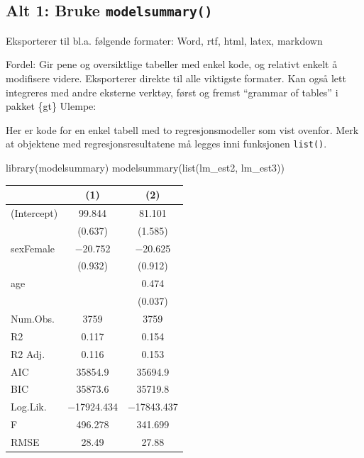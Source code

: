 \documentclass[
  letterpaper,
  DIV=11,
  numbers=noendperiod]{scrreprt}
\newenvironment{Shaded}{\begin{snugshade}}{\end{snugshade}}
\newcommand{\FunctionTok}[1]{\textcolor[rgb]{0.28,0.35,0.67}{#1}}
\newcommand{\NormalTok}[1]{\textcolor[rgb]{0.00,0.23,0.31}{#1}}
\theoremstyle{definition}
\theoremstyle{remark}
\begin{document}
\hypertarget{alt-1-bruke-modelsummary}{%
\subsection{\texorpdfstring{Alt 1: Bruke
\texttt{modelsummary()}}{Alt 1: Bruke modelsummary()}}\label{alt-1-bruke-modelsummary}}

Eksporterer til bl.a. følgende formater: Word, rtf, html, latex,
markdown

Fordel: Gir pene og oversiktlige tabeller med enkel kode, og relativt
enkelt å modifisere videre. Eksporterer direkte til alle viktigste
formater. Kan også lett integreres med andre eksterne verktøy, først og
fremst ``grammar of tables'' i pakket \{gt\} Ulempe:

Her er kode for en enkel tabell med to regresjonsmodeller som vist
ovenfor. Merk at objektene med regresjonsresultatene må legges inni
funksjonen \texttt{list()}.

\begin{Shaded}
\begin{Highlighting}[]
\FunctionTok{library}\NormalTok{(modelsummary)}
\FunctionTok{modelsummary}\NormalTok{(}\FunctionTok{list}\NormalTok{(lm\_est2, lm\_est3))}
\end{Highlighting}
\end{Shaded}

\begin{table}
\centering
\begin{tabular}[t]{lcc}
\toprule
  & (1) & (2)\\
\midrule
(Intercept) & \num{99.844} & \num{81.101}\\
 & (\num{0.637}) & (\num{1.585})\\
sexFemale & \num{-20.752} & \num{-20.625}\\
 & (\num{0.932}) & (\num{0.912})\\
age &  & \num{0.474}\\
 &  & (\num{0.037})\\
\midrule
Num.Obs. & \num{3759} & \num{3759}\\
R2 & \num{0.117} & \num{0.154}\\
R2 Adj. & \num{0.116} & \num{0.153}\\
AIC & \num{35854.9} & \num{35694.9}\\
BIC & \num{35873.6} & \num{35719.8}\\
Log.Lik. & \num{-17924.434} & \num{-17843.437}\\
F & \num{496.278} & \num{341.699}\\
RMSE & \num{28.49} & \num{27.88}\\
\bottomrule
\end{tabular}
\end{table}
\end{document}
